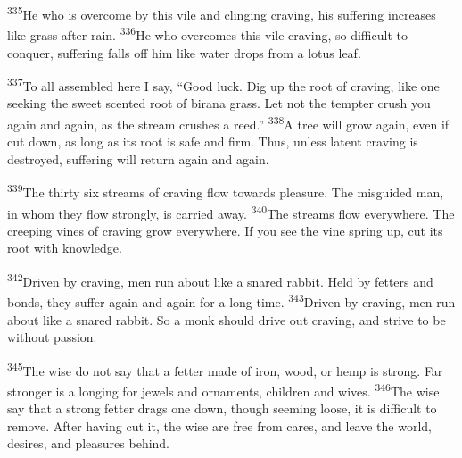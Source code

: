 \documentclass[openany,12pt,english]{book}
\newenvironment{para}{\par\pretolerance=100\tolerance=200\setlength{\emergencystretch}{0.6em}\relax}{\par}
\begin{document}
\begin{para}
    \textsuperscript{335}\thinspace{}He who is o\-ver\-come by this vile and cling\-ing crav\-ing, his suf\-fer\-ing increases like grass af\-ter rain.
    \textsuperscript{336}\thinspace{}He who overcomes this vile crav\-ing, so dif\-fi\-cult to con\-quer, suf\-fer\-ing falls off him like wa\-ter drops from a lo\-tus leaf.
\end{para}

\begin{para}
    \textsuperscript{337}\thinspace{}To all as\-sem\-bled here I say, “Good luck. Dig up the root of crav\-ing, like one seek\-ing the sweet scented root of birana grass. Let not the temp\-ter crush you a\-gain and a\-gain, as the stream crushes a reed.”
    \textsuperscript{338}\thinspace{}A tree will grow a\-gain, e\-ven if cut down, as long as its root is safe and firm. Thus, un\-less la\-tent crav\-ing is destroyed, suf\-fer\-ing will re\-turn a\-gain and a\-gain.
\end{para}

\begin{para}
    \textsuperscript{339}\thinspace{}The thir\-ty six streams of crav\-ing flow to\-wards pleas\-ure. The mis\-guid\-ed man, in whom they flow strongly, is car\-ried a\-way.
    \textsuperscript{340}\thinspace{}The streams flow eve\-ry\-where. The creep\-ing vines of crav\-ing grow eve\-ry\-where. If you see the vine spring up, cut its root with knowl\-edge.
\end{para}

\begin{para}
    \textsuperscript{342}\thinspace{}Driv\-en by crav\-ing, men run a\-bout like a snared rab\-bit. Held by fetters and bonds, they suf\-fer a\-gain and a\-gain for a long time.
    \textsuperscript{343}\thinspace{}Driv\-en by crav\-ing, men run a\-bout like a snared rab\-bit. So a monk should drive out crav\-ing, and strive to be with\-out pas\-sion.
\end{para}

\begin{para}
    \textsuperscript{345}\thinspace{}The wise do not say that a fet\-ter made of i\-ron, wood, or hemp is strong. Far stronger is a long\-ing for jewels and ornaments, chil\-dren and wives.
    \textsuperscript{346}\thinspace{}The wise say that a strong fet\-ter drags one down, though seem\-ing loose, it is dif\-fi\-cult to re\-move. Af\-ter hav\-ing cut it, the wise are free from cares, and leave the world, desires, and pleasures be\-hind.
\end{para}
\end{document}
